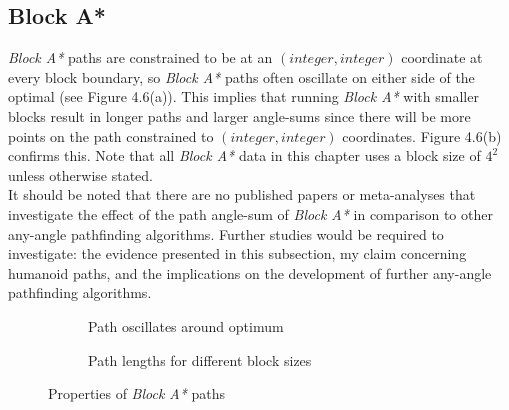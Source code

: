 \documentclass[12pt,notitlepage]{report}
\begin{document}
\subsection{Block A*}
{\em Block A*} paths are constrained to be at an $(integer,integer)$ coordinate at every block boundary, so {\em Block A*} paths often oscillate on either side of the optimal (see Figure 4.6(a)). This implies that running {\em Block A*} with smaller blocks result in longer paths and larger angle-sums since there will be more points on the path constrained to $(integer,integer)$ coordinates. Figure 4.6(b) confirms this. Note that all {\em Block A*} data in this chapter uses a block size of $4^{2}$ unless otherwise stated.\\

\noindent
It should be noted that there are no published papers or meta-analyses that investigate the effect of the path angle-sum of {\em Block A*} in comparison to other any-angle pathfinding algorithms. Further studies would be required to investigate: the evidence presented in this subsection, my claim concerning humanoid paths, and the implications on the development of further any-angle pathfinding algorithms.

\begin{figure}
\centering
  \begin{subfigure}[b]{0.49\textwidth}
  \centering
  \caption{Path oscillates around optimum}
  \end{subfigure}
  \begin{subfigure}[b]{0.49\textwidth}
  \centering
  
  \caption{Path lengths for different block sizes}
  \end{subfigure}
\caption{Properties of {\em Block A*} paths}
\end{figure}
\end{document}
